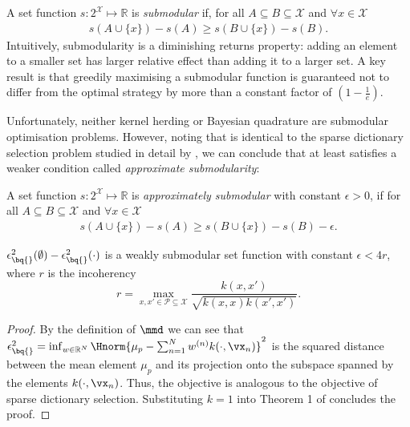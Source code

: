 A set function $s:2^\mathcal{X} \mapsto \mathbb{R}$ is \textit{submodular} if, for all $A\subseteq B\subseteq \mathcal{X}$ and $\forall x \in \mathcal{X}$
%
\begin{align}
	s(A\cup\{x\})-s(A)\geq s(B\cup\{x\})-s(B).
\end{align}
%
Intuitively, submodularity is a diminishing returns property: adding an element to a smaller set has larger relative effect than adding it to a larger set. A key result \cite[see e.\,g.\ ][and references therein]{KrauseCevher10} is that greedily maximising a submodular function is guaranteed not to differ from the optimal strategy by more than a constant factor of $(1-\frac{1}{e})$.

Unfortunately, neither kernel herding or Bayesian quadrature are submodular optimisation problems. However, noting that \sbq{} is identical to the sparse dictionary selection problem studied in detail by \citet{KrauseCevher10}, we can conclude that \sbq{} at least satisfies a weaker condition called \emph{approximate submodularity}:

A set function $s:2^\mathcal{X} \mapsto \mathbb{R}$ is \textit{approximately submodular} with constant $\epsilon>0$, if for all $A\subseteq B\subseteq \mathcal{X}$ and $\forall x \in \mathcal{X}$
%
\begin{align}
s(A\cup\{x\})-s(A)\geq s(B\cup\{x\})-s(B) - \epsilon.
\end{align}

\begin{proposition}\label{prop:submodularity_SBQ}
$\epsilon^{2}_{\bq{}}(\emptyset)-\epsilon^{2}_{\bq{}}(\cdot)$ is a weakly submodular set function with constant $\epsilon<4r$, where $r$ is the incoherency
%
\begin{equation}
	r = \max_{x,x'\in\mathcal{P}\subseteq\mathcal{X}} \frac{k(x,x')}{\sqrt{k(x,x)k(x',x')}}.
\end{equation}

\begin{proof} By the definition of $\mmd$ we can see that
$\epsilon^{2}_{\bq{}} = \inf_{w\in\mathbb{R}^N}\Hnorm{\mu_p - \sum_{n=1}^N w^{(n)}k(\cdot,\vx_n)}^2$ is the squared distance between the mean element $\mu_p$ and its projection onto the subspace spanned by the elements $k(\cdot,\vx_n)$. Thus, the objective is analogous to the objective of sparse dictionary selection. Substituting $k=1$ into Theorem 1 of \citet{KrauseCevher10} concludes the proof.
\end{proof}
\end{proposition}

